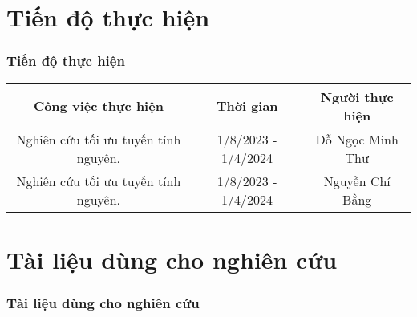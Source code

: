 \documentclass{beamer}
\begin{document}
\section{Tiến độ thực hiện}
\begin{frame}[shrink=25]
    \frametitle{Tiến độ thực hiện}
    \vspace{2cm}
    \begin{table}
        \begin{tabular}{|c|c|c|}
            \hline
            Công việc thực hiện & Thời gian & Người thực hiện \\
            \hline \hline
            Nghiên cứu tối ưu tuyến tính nguyên. & 1/8/2023 - 1/4/2024 & Đỗ Ngọc Minh Thư \\
            Nghiên cứu tối ưu tuyến tính nguyên. & 1/8/2023 - 1/4/2024 & Nguyễn Chí Bằng \\
            \hline
        \end{tabular}
    \end{table}
\end{frame}
\section{Tài liệu dùng cho nghiên cứu}
\begin{frame}[allowframebreaks]
    \frametitle{Tài liệu dùng cho nghiên cứu}
    
    
\end{frame}
\end{document}
